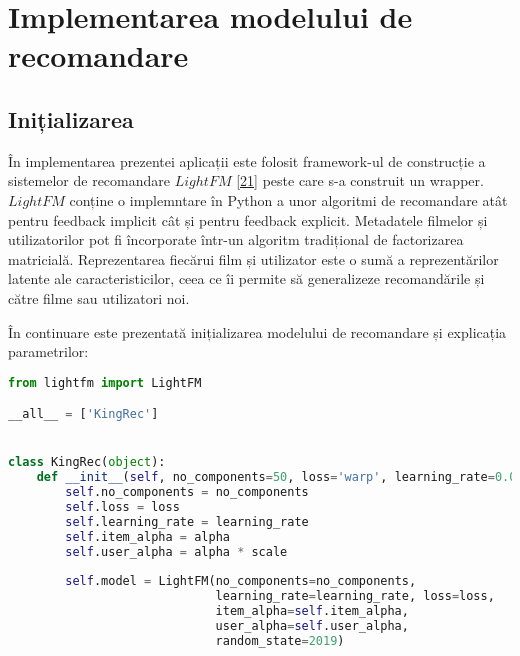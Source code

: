 \section{Implementarea modelului de recomandare}
\subsection{Inițializarea}
În implementarea prezentei aplicații este folosit framework-ul de construcție a sistemelor de recomandare $LightFM$ \hyperlink{lightfm}{[21]} peste care s-a construit un wrapper. 
$LightFM$ conține o implemntare în Python a unor algoritmi de recomandare atât pentru feedback implicit cât și pentru feedback explicit. Metadatele filmelor și utilizatorilor pot fi încorporate într-un algoritm tradițional de factorizarea matricială. Reprezentarea fiecărui film și utilizator este o sumă a reprezentărilor latente ale caracteristicilor, ceea ce îi permite să generalizeze recomandările și către filme sau utilizatori noi.

În continuare este prezentată inițializarea modelului de recomandare și explicația parametrilor:
\begin{lstlisting}[language=Python, caption=Definirea modelului de recomandare]
from lightfm import LightFM

__all__ = ['KingRec']


class KingRec(object):
    def __init__(self, no_components=50, loss='warp', learning_rate=0.05, alpha=0.02, scale=0.07):
        self.no_components = no_components
        self.loss = loss
        self.learning_rate = learning_rate
        self.item_alpha = alpha
        self.user_alpha = alpha * scale
        
        self.model = LightFM(no_components=no_components, 
        					 learning_rate=learning_rate, loss=loss,
                             item_alpha=self.item_alpha, 
                             user_alpha=self.user_alpha, 
                             random_state=2019)                       
\end{lstlisting}

